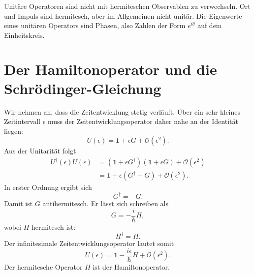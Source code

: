 
Unitäre Operatoren sind nicht mit hermiteschen Observablen zu verwechseln. Ort und Impuls sind hermitesch, aber im Allgemeinen nicht unitär. Die Eigenwerte eines unitären Operators sind Phasen, also Zahlen der Form \(e^{i\theta}\) auf dem Einheitskreis.

\begin{classroomqa}
\end{classroomqa}

\section{Der Hamiltonoperator und die Schr\"odinger-Gleichung}

Wir nehmen an, dass die Zeitentwicklung stetig verläuft. Über ein sehr kleines Zeitintervall \(\epsilon\) muss der Zeitentwicklungsoperator daher nahe an der Identität liegen:
\begin{equation}
U(\epsilon)=\mathbf 1+\epsilon G+\mathcal O(\epsilon^2).
\end{equation}
Aus der Unitarität folgt
\begin{align}
U^\dagger(\epsilon)U(\epsilon)
&=
\left(\mathbf 1+\epsilon G^\dagger\right)
\left(\mathbf 1+\epsilon G\right)
+\mathcal O(\epsilon^2)
\\
&=
\mathbf 1+\epsilon(G^\dagger+G)
+\mathcal O(\epsilon^2).
\end{align}
In erster Ordnung ergibt sich
\begin{equation}
G^\dagger=-G.
\end{equation}
Damit ist \(G\) antihermitesch. Er lässt sich schreiben als
\begin{equation}
G=-\frac{i}{\hbar}H,
\end{equation}
wobei \(H\) hermitesch ist:
\begin{equation}
H^\dagger=H.
\end{equation}
Der infinitesimale Zeitentwicklungsoperator lautet somit
\begin{equation}
U(\epsilon)
=
\mathbf 1-\frac{i\epsilon}{\hbar}H
+\mathcal O(\epsilon^2).
\end{equation}
Der hermitesche Operator \(H\) ist der Hamiltonoperator.

